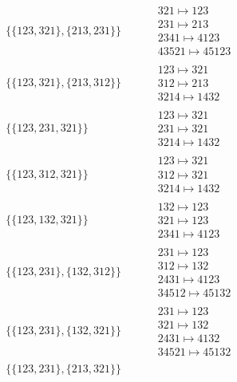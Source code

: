 \begin{tiny}
\begin{align}
\\
\{\{123, 321\}, \{213, 231\}\}
\quad
&
\phantom{.}
&
\begin{matrix}
321 \mapsto 123\\231 \mapsto 213\\2341 \mapsto 4123\\43521 \mapsto 45123
\end{matrix}
\\
\{\{123, 321\}, \{213, 312\}\}
\quad
&
\phantom{.}
&
\begin{matrix}
123 \mapsto 321\\312 \mapsto 213\\3214 \mapsto 1432
\end{matrix}
\\
\{\{123, 231, 321\}\}
\quad
&
\phantom{.}
&
\begin{matrix}
123 \mapsto 321\\231 \mapsto 321\\3214 \mapsto 1432
\end{matrix}
\\
\{\{123, 312, 321\}\}
\quad
&
\phantom{.}
&
\begin{matrix}
123 \mapsto 321\\312 \mapsto 321\\3214 \mapsto 1432
\end{matrix}
\\
\{\{123, 132, 321\}\}
\quad
&
\phantom{.}
&
\begin{matrix}
132 \mapsto 123\\321 \mapsto 123\\2341 \mapsto 4123
\end{matrix}
\\
\{\{123, 231\}, \{132, 312\}\}
\quad
&
\phantom{.}
&
\begin{matrix}
231 \mapsto 123\\312 \mapsto 132\\2431 \mapsto 4123\\34512 \mapsto 45132
\end{matrix}
\\
\{\{123, 231\}, \{132, 321\}\}
\quad
&
\phantom{.}
&
\begin{matrix}
231 \mapsto 123\\321 \mapsto 132\\2431 \mapsto 4132\\34521 \mapsto 45132
\end{matrix}
\\
\{\{123, 231\}, \{213, 321\}\}
\quad
&
\phantom{.}

\end{align}
\end{tiny}
